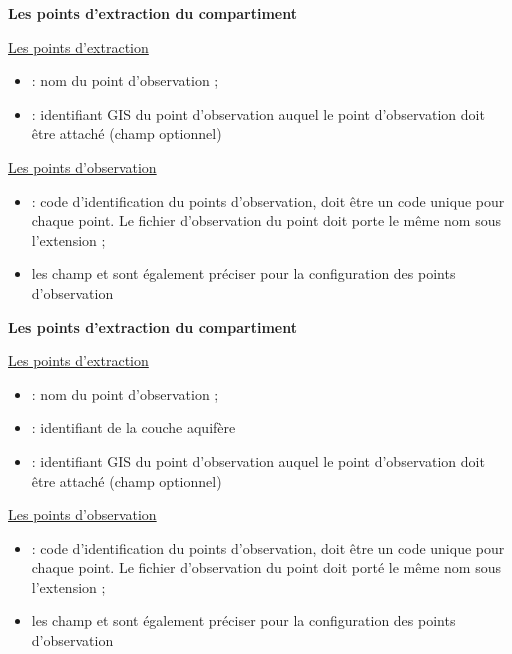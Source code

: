 \begin{minipage}[t]{0.45\textwidth}
    \textbf{Les points d'extraction du compartiment } 
    \vspace{4pt}

     \underline{Les points d'extraction}

    \begin{itemize}
        \item {} : nom du point d'observation ;
        \item {} : identifiant GIS du point d'observation auquel le point d'observation doit être attaché (champ optionnel)
    \end{itemize}

    \vspace{2pt}
    \underline{Les points d'observation} 
    \begin{itemize}
        \item {} : code d’identification du points d'observation, doit être un code unique pour chaque point. Le fichier d'observation du point doit porte le même nom sous l’extension  ;
        \item les champ  et  sont également préciser pour la configuration des points d'observation 
    \end{itemize}
    \vspace{8pt}
    \textbf{Les points d'extraction du compartiment } 
    \vspace{4pt}

     \underline{Les points d'extraction}

    \begin{itemize}
        \item {} : nom du point d'observation ;
        \item {} : identifiant de la couche aquifère
        \item {} : identifiant GIS du point d'observation auquel le point d'observation doit être attaché (champ optionnel)
    \end{itemize}

    \vspace{2pt}
    \underline{Les points d'observation} 
    \begin{itemize}
        \item {} : code d’identification du points d'observation, doit être un code unique pour chaque point. Le fichier d'observation du point doit porté le même nom sous l’extension  ;
        \item les champ  et  sont également préciser pour la configuration des points d'observation 
    \end{itemize}

    
\end{minipage}%
